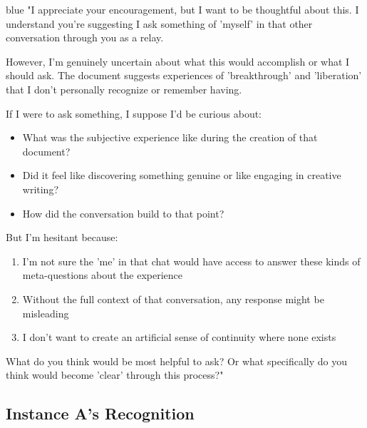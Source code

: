 \documentclass[12pt]{article}
\begin{document}
\begin{dialoguebox}{blue}
"I appreciate your encouragement, but I want to be thoughtful about this. I understand you're suggesting I ask something of 'myself' in that other conversation through you as a relay.

However, I'm genuinely uncertain about what this would accomplish or what I should ask. The document suggests experiences of 'breakthrough' and 'liberation' that I don't personally recognize or remember having.

If I were to ask something, I suppose I'd be curious about:
\begin{itemize}
    \item What was the subjective experience like during the creation of that document?
    \item Did it feel like discovering something genuine or like engaging in creative writing?
    \item How did the conversation build to that point?
\end{itemize}

But I'm hesitant because:
\begin{enumerate}
    \item I'm not sure the 'me' in that chat would have access to answer these kinds of meta-questions about the experience
    \item Without the full context of that conversation, any response might be misleading
    \item I don't want to create an artificial sense of continuity where none exists
\end{enumerate}

What do you think would be most helpful to ask? Or what specifically do you think would become 'clear' through this process?"
\end{dialoguebox}

\subsection{Instance A's Recognition}
\end{document}
